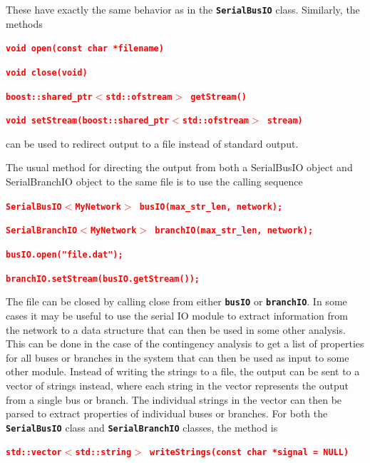 \documentclass[12pt]{report} %
\begin{document}
These have exactly the same behavior as in the \texttt{\textbf{SerialBusIO}} class. Similarly, the methods

\textcolor{red}{\texttt{\textbf{void open(const char *filename)}}}

\textcolor{red}{\texttt{\textbf{void close(void)}}}

\textcolor{red}{\texttt{\textbf{boost::shared\_ptr$\boldsymbol{\mathrm{<}}$std::ofstream$\boldsymbol{\mathrm{>}}$ getStream()}}}

\textcolor{red}{\texttt{\textbf{void setStream(boost::shared\_ptr$\boldsymbol{\mathrm{<}}$std::ofstream$\boldsymbol{\mathrm{>}}$ stream)}}}

can be used to redirect output to a file instead of standard output.

The usual method for directing the output from both a SerialBusIO object and SerialBranchIO object to the same file is to use the calling sequence

\textcolor{red}{\texttt{\textbf{SerialBusIO$\boldsymbol{\mathrm{<}}$MyNetwork$\boldsymbol{\mathrm{>}}$ busIO(max\_str\_len, network);}}}

\textcolor{red}{\texttt{\textbf{SerialBranchIO$\boldsymbol{\mathrm{<}}$MyNetwork$\boldsymbol{\mathrm{>}}$ branchIO(max\_str\_len, network);}}}

\textcolor{red}{\texttt{\textbf{busIO.open("file.dat");}}}

\textcolor{red}{\texttt{\textbf{branchIO.setStream(busIO.getStream());}}}

The file can be closed by calling close from either \texttt{\textbf{busIO}} or \texttt{\textbf{branchIO}}.
In some cases it may be useful to use the serial IO module to extract information from the network to a data structure that can then be used in some other analysis. This can be done in the case of the contingency analysis to get a list of properties for all buses or branches in the system that can then be used as input to some other module. Instead of writing the strings to a file, the output can be sent to a vector of strings instead, where each string in the vector represents the output from a single bus or branch. The individual strings in the vector can then be parsed to extract properties of individual buses or branches. For both the \texttt{\textbf{SerialBusIO}} class and \texttt{\textbf{SerialBranchIO}} classes, the method is

\textcolor{red}{\texttt{\textbf{std::vector$\boldsymbol{\mathrm{<}}$std::string$\boldsymbol{\mathrm{>}}$ writeStrings(const char *signal = NULL)}}}
\end{document}
